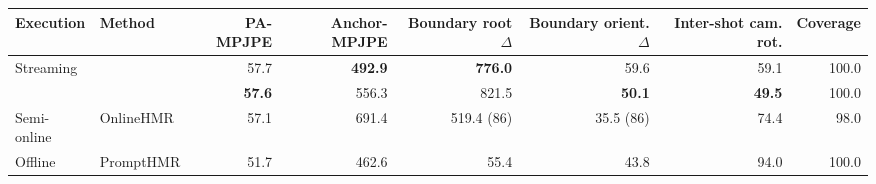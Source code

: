 \begin{tabular}{llrrrrrr}
\toprule
Execution & Method & PA-MPJPE & Anchor-MPJPE & Boundary root $\Delta$ & Boundary orient. $\Delta$ & Inter-shot cam. rot. & Coverage \\
\midrule
\multirow{2}{*}{Streaming} & \humanthree{} & 57.7 & \textbf{492.9} & \textbf{776.0} & 59.6 & 59.1 & 100.0 \\
 & \method{} & \textbf{57.6} & 556.3 & 821.5 & \textbf{50.1} & \textbf{49.5} & 100.0 \\
\midrule
Semi-online & OnlineHMR & 57.1 & 691.4 & 519.4 (86) & 35.5 (86) & 74.4 & 98.0 \\
\midrule
Offline & PromptHMR & 51.7 & 462.6 & 55.4 & 43.8 & 94.0 & 100.0 \\
\bottomrule
\end{tabular}
